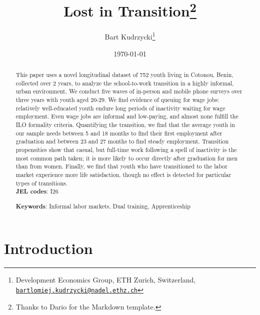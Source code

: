 \documentclass[
  11pt,
a4paper
]{article}
\title{Lost in Transition\thanks{Thanks to Dario for the Markdown template.}}
\author{
  Bart Kudrzycki\thanks{
    Development Economics Group, ETH Zurich, Switzerland, \href{mailto:bartlomiej.kudrzycki@nadel.ethz.ch}{\nolinkurl{bartlomiej.kudrzycki@nadel.ethz.ch}}
  }
}
\date{\today}
\begin{document}
\maketitle
\thispagestyle{empty} %
\begin{abstract}
  \noindent This paper uses a novel longitudinal dataset of 752 youth living in Cotonou, Benin, collected over 2 years, to analyze the school-to-work transition in a highly informal, urban environment. We conduct five waves of in-person and mobile phone surveys over three years with youth aged 20-29. We find evidence of queuing for wage jobs: relatively well-educated youth endure long periods of inactivity waiting for wage employment. Even wage jobs are informal and low-paying, and almost none fulfill the ILO formality criteria. Quantifying the transition, we find that the average youth in our sample needs between 5 and 18 months to find their first employment after graduation and between 23 and 27 months to find steady employment. Transition propensities show that casual, but full-time work following a spell of inactivity is the most common path taken; it is more likely to occur directly after graduation for men than from women. Finally, we find that youth who have transitioned to the labor market experience more life satisfaction, though no effect is detected for particular types of transitions.\\
  
  \noindent \textbf{JEL codes}: I26
    
  \noindent \textbf{Keywords}: Informal labor markets, Dual training, Apprenticeship
  \end{abstract}
\restoregeometry

\tableofcontents
\listoffigures
\listoftables
\newpage

\doublespacing

\hypertarget{survey-intro}{%
\section{Introduction}\label{survey-intro}}
\end{document}
